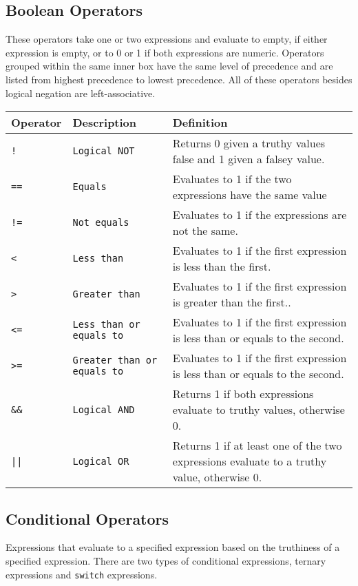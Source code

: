 		\subsection{Boolean Operators}
			These operators take one or two expressions and evaluate to empty, if either expression is empty, or to 0 or 1 if both expressions are numeric. Operators grouped within the same inner box have the same level of precedence and are listed from highest precedence to lowest precedence. All of these operators besides logical negation are left-associative.
			\begin{table}[H]
			\begin{tabular}{ |p{2cm}|p{5cm}|p{7cm}|  }
			\hline
			\textbf{Operator} & \textbf{Description} & \textbf{Definition} \\ \hline
			\texttt{!} & \texttt{Logical NOT} & {Returns 0 given a truthy values false and 1 given a falsey value.} \\ \hline
			\texttt{==} & \texttt{Equals} & {Evaluates to 1 if the two expressions have the same value} \\
			\texttt{!=} & \texttt{Not equals} & {Evaluates to 1 if the expressions are not the same.} \\
			\texttt{<} & \texttt{Less than} & {Evaluates to 1 if the first expression is less than the first.} \\
			\texttt{>} & \texttt{Greater than} & {Evaluates to 1 if the first expression is greater than the first.}. \\
			\texttt{<=} & \texttt{Less than or equals to} & {Evaluates to 1 if the first expression is less than or equals to the second.} \\
			\texttt{>=} & \texttt{Greater than or equals to} & {Evaluates to 1 if the first expression is less than or equals to the second.} \\ \hline
			\texttt{\&\&} & \texttt{Logical AND} & {Returns 1 if both expressions evaluate to truthy values, otherwise 0.} \\ \hline
			\texttt{||} & \texttt{Logical OR} & {Returns 1 if at least one of the two expressions evaluate to a truthy value, otherwise 0.} \\ \hline
			\end{tabular}
			\end{table}
		\subsection{Conditional Operators}
			Expressions that evaluate to a specified expression based on the truthiness of a specified expression. There are two types of conditional expressions, ternary expressions and \texttt{switch} expressions.
			
